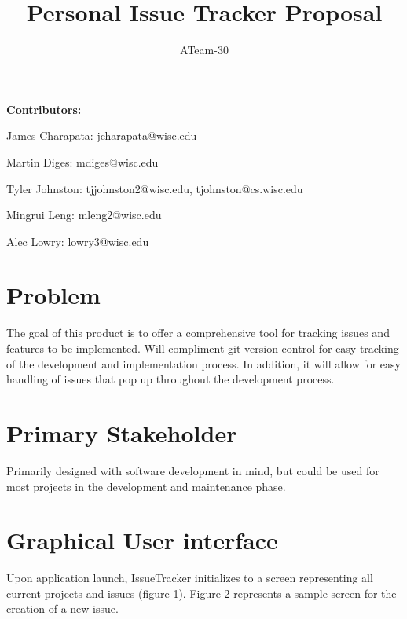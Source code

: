 \documentclass{article}
\title{Personal Issue Tracker Proposal}
\author{ATeam-30}
\begin{document}
\maketitle

\textbf{Contributors:}

James Charapata: jcharapata@wisc.edu

Martin Diges: mdiges@wisc.edu

Tyler Johnston: tjjohnston2@wisc.edu, tjohnston@cs.wisc.edu

Mingrui Leng: mleng2@wisc.edu

Alec Lowry: lowry3@wisc.edu


\tableofcontents
\newpage

\section{Problem}

    The goal of this product is to offer a comprehensive tool for tracking issues and features to be implemented.
    Will compliment git version control for easy tracking of the development and implementation process.
    In addition, it will allow for easy handling of issues that pop up throughout the development process.

\section{Primary Stakeholder}

    Primarily designed with software development in mind, but could be used for most projects in the development and maintenance phase.

\section{Graphical User interface}

    Upon application launch, IssueTracker initializes to a screen representing all current projects and issues (figure 1). Figure 2 represents a sample screen for the creation of a new issue.
\end{document}
